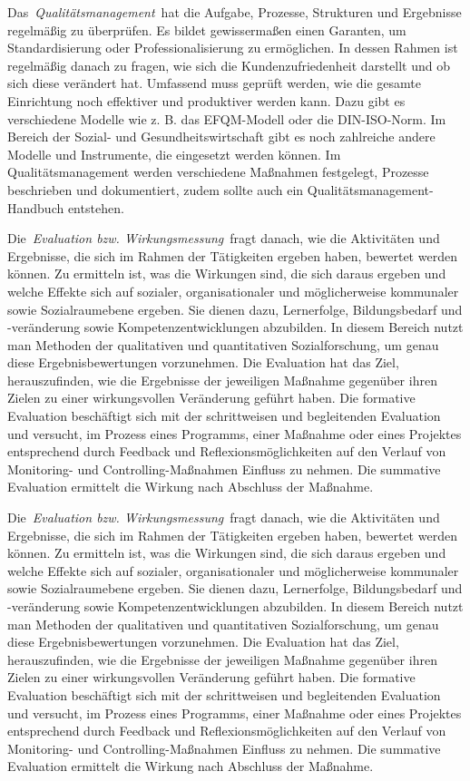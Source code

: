 \documentclass[
  letterpaper,
]{book}
\begin{document}
Das~\emph{Qualitätsmanagement}~hat die Aufgabe, Prozesse, Strukturen und
Ergebnisse regelmäßig zu überprüfen. Es bildet gewissermaßen einen
Garanten, um Standardisierung oder Professionalisierung zu ermöglichen.
In dessen Rahmen ist regelmäßig danach zu fragen, wie sich die
Kundenzufriedenheit darstellt und ob sich diese verändert hat. Umfassend
muss geprüft werden, wie die gesamte Einrichtung noch effektiver und
produktiver werden kann. Dazu gibt es verschiedene Modelle wie z. B. das
EFQM-Modell oder die DIN-ISO-Norm. Im Bereich der Sozial- und
Gesundheitswirtschaft gibt es noch zahlreiche andere Modelle und
Instrumente, die eingesetzt werden können. Im Qualitätsmanagement werden
verschiedene Maßnahmen festgelegt, Prozesse beschrieben und
dokumentiert, zudem sollte auch ein Qualitätsmanagement-Handbuch
entstehen.

Die~\emph{Evaluation bzw. Wirkungsmessung}~fragt danach, wie die
Aktivitäten und Ergebnisse, die sich im Rahmen der Tätigkeiten ergeben
haben, bewertet werden können. Zu ermitteln ist, was die Wirkungen sind,
die sich daraus ergeben und welche Effekte sich auf sozialer,
organisationaler und möglicherweise kommunaler sowie Sozialraumebene
ergeben. Sie dienen dazu, Lernerfolge, Bildungsbedarf und -veränderung
sowie Kompetenzentwicklungen abzubilden. In diesem Bereich nutzt man
Methoden der qualitativen und quantitativen Sozialforschung, um genau
diese Ergebnisbewertungen vorzunehmen. Die Evaluation hat das Ziel,
herauszufinden, wie die Ergebnisse der jeweiligen Maßnahme gegenüber
ihren Zielen zu einer wirkungsvollen Veränderung geführt haben. Die
formative Evaluation beschäftigt sich mit der schrittweisen und
begleitenden Evaluation und versucht, im Prozess eines Programms, einer
Maßnahme oder eines Projektes entsprechend durch Feedback und
Reflexionsmöglichkeiten auf den Verlauf von Monitoring- und
Controlling-Maßnahmen Einfluss zu nehmen. Die summative Evaluation
ermittelt die Wirkung nach Abschluss der Maßnahme.

Die~\emph{Evaluation bzw. Wirkungsmessung}~fragt danach, wie die
Aktivitäten und Ergebnisse, die sich im Rahmen der Tätigkeiten ergeben
haben, bewertet werden können. Zu ermitteln ist, was die Wirkungen sind,
die sich daraus ergeben und welche Effekte sich auf sozialer,
organisationaler und möglicherweise kommunaler sowie Sozialraumebene
ergeben. Sie dienen dazu, Lernerfolge, Bildungsbedarf und -veränderung
sowie Kompetenzentwicklungen abzubilden. In diesem Bereich nutzt man
Methoden der qualitativen und quantitativen Sozialforschung, um genau
diese Ergebnisbewertungen vorzunehmen. Die Evaluation hat das Ziel,
herauszufinden, wie die Ergebnisse der jeweiligen Maßnahme gegenüber
ihren Zielen zu einer wirkungsvollen Veränderung geführt haben. Die
formative Evaluation beschäftigt sich mit der schrittweisen und
begleitenden Evaluation und versucht, im Prozess eines Programms, einer
Maßnahme oder eines Projektes entsprechend durch Feedback und
Reflexionsmöglichkeiten auf den Verlauf von Monitoring- und
Controlling-Maßnahmen Einfluss zu nehmen. Die summative Evaluation
ermittelt die Wirkung nach Abschluss der Maßnahme.
\end{document}
